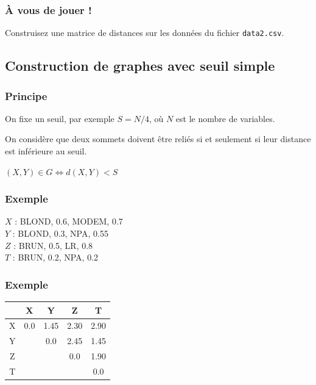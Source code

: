 \documentclass[11pt]{beamer}
\newenvironment{slide}[1]{%
\begin{frame}[environment=slide]
\frametitle{#1}
}{%
\end{frame}
}
\begin{document}
\begin{slide}{{\`A} vous de jouer !}

Construisez une matrice de distances sur les données du fichier \texttt{data2.csv}.

\end{slide}

\subsection{Construction de graphes avec seuil simple}

\begin{slide}{Principe}

On fixe un seuil, par exemple $S=N/4$, où $N$ est le nombre de variables.

\pause

On considère que deux sommets doivent être reliés si et seulement si leur distance est inférieure au seuil.

$(X,Y) \in G \Longleftrightarrow d(X,Y) < S$

\end{slide}

\begin{slide}{Exemple}

$X$ : BLOND, 0.6, MODEM, 0.7\\
$Y$ : BLOND, 0.3, NPA, 0.55\\
$Z$ : BRUN, 0.5, LR, 0.8\\
$T$ : BRUN, 0.2, NPA, 0.2\\

\end{slide}

\begin{slide}{Exemple}

\begin{tabular}{|c|c|c|c|c|}
\hline
& X & Y & Z & T \\ \hline
X &\cellcolor{black!20} \color{black!20} 0.0&1.45&2.30&2.90 \\ \hline
Y &&\cellcolor{black!20} \color{black!20} 0.0&2.45&1.45 \\ \hline
Z &&&\cellcolor{black!20} \color{black!20} 0.0&1.90 \\ \hline
T &&&&\cellcolor{black!20} \color{black!20} 0.0 \\ \hline
\end{tabular}

\end{slide}
\end{document}
